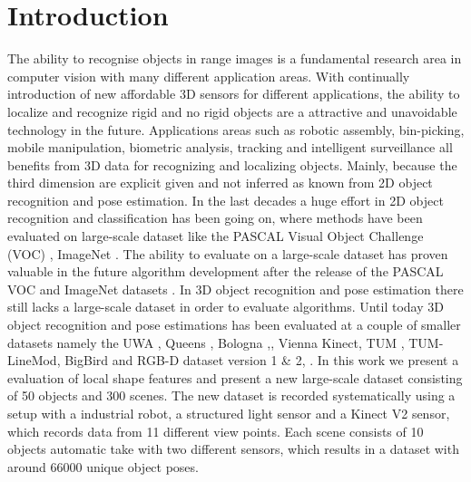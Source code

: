 \documentclass[10pt,twocolumn,letterpaper]{article}
\begin{document}
\section{Introduction}
The ability to recognise objects in range images is a fundamental research area in computer vision with many different application areas. With continually introduction of new affordable 3D sensors for different applications, the ability to localize and recognize rigid and no rigid objects are a attractive and unavoidable technology in the future. Applications areas such as robotic assembly, bin-picking, mobile manipulation, biometric analysis, tracking and intelligent surveillance all benefits from 3D data for recognizing and localizing objects. Mainly, because the third dimension are explicit given and not inferred as known from 2D object recognition and pose estimation. In the last decades a huge effort in 2D object recognition and classification has been going on, where methods have been evaluated on large-scale dataset like the PASCAL Visual Object Challenge (VOC) \cite{Everingham2014}, ImageNet \cite{Imagenet2009}. The ability to evaluate on a large-scale dataset has proven valuable in the future algorithm development after the release of the PASCAL VOC and ImageNet datasets \cite{Everingham2014}. In 3D object recognition and pose estimation there still lacks a large-scale dataset in order to evaluate algorithms. Until today 3D object recognition and pose estimations has been evaluated at a couple of smaller datasets namely the UWA \cite{Mian2006}, Queens \cite{Taati2007}, Bologna \cite{Salti2014},\cite{Tombari2010}, Vienna Kinect\cite{Aldoma2012}, TUM \cite{Rodola2013}, TUM-LineMod\cite{Hinterstoisser2012}, BigBird\cite{BigBIRD} and RGB-D dataset version 1 \& 2\cite{Lai2011}, \cite{Lai2014}.
In this work we present a evaluation of local shape features and present a new large-scale dataset consisting of 50 objects and 300 scenes. The new dataset is recorded systematically using a setup with a industrial robot, a structured light sensor and a Kinect V2 sensor, which records data from 11 different view points. Each scene consists of 10 objects  automatic take with two different sensors, which results in a dataset with around 66000 unique object poses. 


\end{document}
